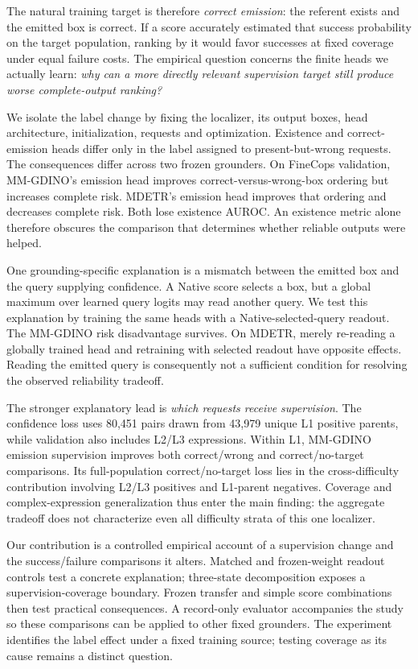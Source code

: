 \documentclass[10pt,twocolumn,letterpaper]{article}
\begin{document}
The natural training target is therefore \emph{correct emission}: the
referent exists and the emitted box is correct. If a score accurately
estimated that success probability on the target population, ranking by
it would favor successes at fixed coverage under equal failure costs.
The empirical question concerns the finite heads we actually learn:
\emph{why can a more directly relevant supervision target still produce
worse complete-output ranking?}

We isolate the label change by fixing the localizer, its output boxes,
head architecture, initialization, requests and optimization. Existence
and correct-emission heads differ only in the label assigned to
present-but-wrong requests. The consequences differ across two frozen
grounders. On FineCops validation, MM-GDINO's emission head improves
correct-versus-wrong-box ordering but increases complete risk. MDETR's
emission head improves that ordering and decreases complete risk. Both
lose existence AUROC. An existence metric alone therefore obscures the
comparison that determines whether reliable outputs were helped.

One grounding-specific explanation is a mismatch between the emitted box
and the query supplying confidence. A Native score selects a box, but a
global maximum over learned query logits may read another query. We test
this explanation by training the same heads with a Native-selected-query
readout. The MM-GDINO risk disadvantage survives. On MDETR, merely
re-reading a globally trained head and retraining with selected readout
have opposite effects. Reading the emitted query is consequently not a
sufficient condition for resolving the observed reliability tradeoff.

The stronger explanatory lead is \emph{which requests receive supervision}.
The confidence loss uses 80,451 pairs drawn from 43,979 unique L1 positive
parents, while validation also includes L2/L3 expressions. Within L1,
MM-GDINO emission supervision improves both correct/wrong and correct/no-target
comparisons. Its full-population correct/no-target loss lies in the
cross-difficulty contribution involving L2/L3 positives and L1-parent
negatives. Coverage and complex-expression generalization thus enter the
main finding: the aggregate tradeoff does not characterize even all
difficulty strata of this one localizer.

Our contribution is a controlled empirical account of a supervision change
and the success/failure comparisons it alters. Matched and frozen-weight
readout controls test a concrete explanation; three-state decomposition
exposes a supervision-coverage boundary. Frozen transfer and simple score
combinations then test practical consequences. A record-only evaluator
accompanies the study so these comparisons can be applied to other fixed
grounders. The experiment identifies the label effect under a fixed
training source; testing coverage as its cause remains a distinct question.
\end{document}
